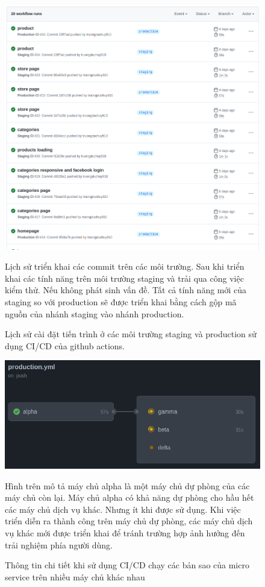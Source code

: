 \begin{figure}[!htbp]\fontsize{13px}{13px}\selectfont
\centering
		\includegraphics[width=\textwidth]{./results/deployments}
		\caption{Lịch sử cài đặt tiến trình ở các môi trường \gls{staging} và \gls{production} sử dụng CI/CD của github actions.}
\justifying
Lịch sử triển khai các commit trên các môi trường. Sau khi triển khai các tính năng trên môi trường \gls{staging} và trải qua công việc kiểm thử. Nếu không phát sinh vấn đề. Tất cả tính năng mới của \gls{staging} so với \gls{production} sẽ được triển khai bằng cách gộp mã nguồn của nhánh \gls{staging} vào nhánh \gls{production}.
	
\end{figure}
\clearpage
\begin{figure}[h!]\fontsize{13px}{13px}\selectfont
\centering
		\includegraphics[width=\textwidth]{./results/jobs}
		\caption{Thông tin chi tiết khi sử dụng CI/CD chạy các bản sao của micro service trên nhiều máy chủ khác nhau}
\justifying
Hình trên mô tả máy chủ alpha là một máy chủ dự phòng của các máy chủ còn lại. Máy chủ alpha có khả năng dự phòng cho hầu hết các máy chủ dịch vụ khác. Nhưng ít khi được sử dụng. Khi việc triển diễn ra thành công trên máy chủ dự phòng, các máy chủ dịch vụ khác mới được triển khai để tránh trường hợp ảnh hưởng đến trải nghiệm phía người dùng.
\end{figure}



